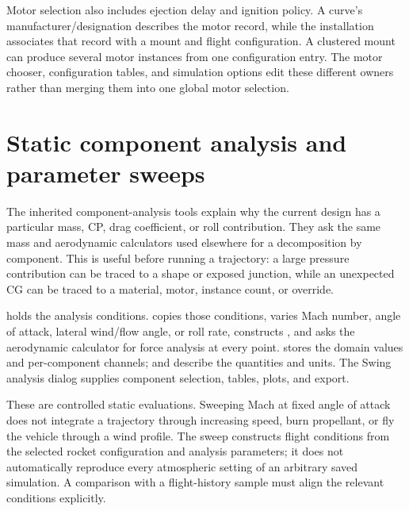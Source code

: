 Motor selection also includes ejection delay and ignition policy. A curve's manufacturer/designation describes the motor record, while the installation associates that record with a mount and flight configuration. A clustered mount can produce several motor instances from one configuration entry. The motor chooser, configuration tables, and simulation options edit these different owners rather than merging them into one global motor selection.


\section{Static component analysis and parameter sweeps}\label{sec:static-analysis}
The inherited component-analysis tools explain why the current design has a particular mass, CP, drag coefficient, or roll contribution. They ask the same mass and aerodynamic calculators used elsewhere for a decomposition by component. This is useful before running a trajectory: a large pressure contribution can be traced to a shape or exposed junction, while an unexpected CG can be traced to a material, motor, instance count, or override.

 holds the analysis conditions.  copies those conditions, varies Mach number, angle of attack, lateral wind/flow angle, or roll rate, constructs , and asks the aerodynamic calculator for force analysis at every point.  stores the domain values and per-component channels;  and  describe the quantities and units. The Swing analysis dialog supplies component selection, tables, plots, and export.

These are controlled static evaluations. Sweeping Mach at fixed angle of attack does not integrate a trajectory through increasing speed, burn propellant, or fly the vehicle through a wind profile. The sweep constructs flight conditions from the selected rocket configuration and analysis parameters; it does not automatically reproduce every atmospheric setting of an arbitrary saved simulation. A comparison with a flight-history sample must align the relevant conditions explicitly.

